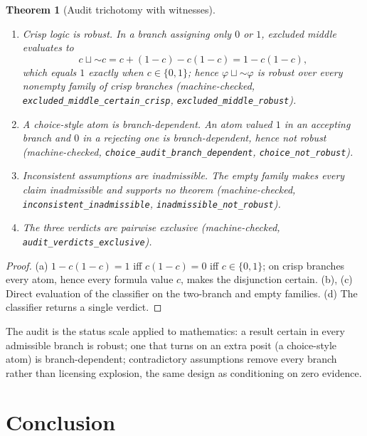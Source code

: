 \documentclass[11pt,a4paper]{article}
\newtheorem{theorem}{Theorem}[section]
\newcommand{\negc}{\mathord{\sim}}
\newcommand{\disjc}{\sqcup}
\begin{document}
\begin{theorem}[Audit trichotomy with witnesses]
\label{thm:audit}
\begin{enumerate}[label=\textup{(\alph*)},nosep]
\item \emph{Crisp logic is robust.} %
  In a branch assigning only $0$ or $1$, excluded middle evaluates to
  \[
    c \disjc \negc c = c + (1 - c) - c(1 - c) = 1 - c(1 - c),
  \]
  which equals $1$ exactly when $c \in \{0, 1\}$; hence
$\varphi \disjc \negc\varphi$ is robust over every nonempty family of %
  crisp branches
  (machine-checked, \texttt{excluded\_middle\_certain\_crisp},
\texttt{excluded\_middle\_robust}). %
\item \emph{A choice-style atom is branch-dependent.}
  An atom valued $1$ in an accepting branch and $0$ in a rejecting one
is branch-dependent, hence not robust %
  (machine-checked, \texttt{choice\_audit\_branch\_dependent},
\texttt{choice\_not\_robust}). %
\item \emph{Inconsistent assumptions are inadmissible.}
  The empty family makes every claim inadmissible and supports no
  theorem
  (machine-checked, \texttt{inconsistent\_inadmissible},
\texttt{inadmissible\_not\_robust}). %
\item The three verdicts are pairwise exclusive
  (machine-checked, \texttt{audit\_verdicts\_exclusive}).
\end{enumerate}
\end{theorem}
\begin{proof}
(a) $1 - c(1-c) = 1$ iff $c(1-c) = 0$ iff $c \in \{0,1\}$; on crisp
branches every atom, hence every formula value $c$, makes the
disjunction certain.
(b), (c) Direct evaluation of the classifier on the two-branch and
empty families.
(d) The classifier returns a single verdict.
\end{proof}

The audit is the status scale applied to mathematics: a result certain
in every admissible branch is robust; one that turns on an extra posit %
(a choice-style atom) is branch-dependent; contradictory assumptions
remove every branch rather than licensing explosion, the same design
as conditioning on zero evidence.

\section{Conclusion}
\label{sec:conclusion}
\end{document}
